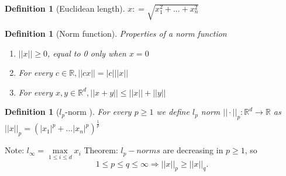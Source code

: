 \documentclass[11pt]{article}
\newtheorem{definition}[theorem]{Definition}
\begin{document}
\begin{definition}[Euclidean length]
    $x : = \sqrt{x_1^2 + ... + x_n^2}$ 
\end{definition}

\begin{definition}[Norm function] Properties of a norm function
    \begin{enumerate}
        \item $||x|| \geq 0$, equal to 0 only when $x = 0$
        \item For every $c\in \mathbb{R}, ||cx|| = |c|||x||$
        \item For every $x, y \in \mathbb{R}^d, ||x+y|| \leq ||x|| + ||y||$    
    \end{enumerate}
    
    
\end{definition}

\begin{definition}[$l_p$-norm ]
    For every $ p \geq 1 $ we define $l_p$ norm $|| \cdot ||_p : \mathbb{R}^d \to \mathbb{R}$ as $||x||_p = (|x_1|^p + ... |x_n|^p)^\frac{1}{p}$    
    
\end{definition}
Note: $l_\infty = \underset{1 \leq i \leq d}{\max}x_i$ 
\newline
Theorem: $l_p-norms$ are decreasing in $ p \geq 1$, so
\[
1 \leq p \leq q \leq \infty \Rightarrow ||x||_p \geq ||x||_q
.\]    
\end{document}
